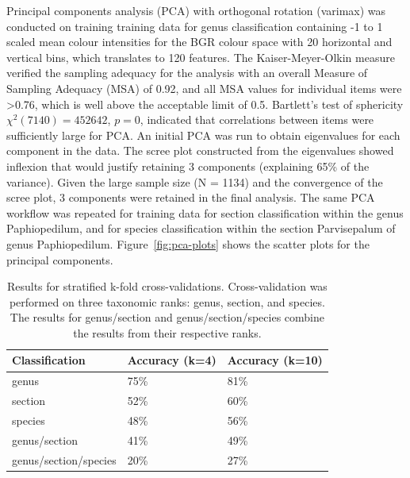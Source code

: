\documentclass[3p,twocolumn,10pt]{elsarticle}
\begin{document}
Principal components analysis (PCA) with orthogonal rotation (varimax) was conducted on training training data for genus classification containing -1 to 1 scaled mean colour intensities for the BGR colour space with 20 horizontal and vertical bins, which translates to 120 features. The Kaiser-Meyer-Olkin measure verified the sampling adequacy for the analysis with an overall Measure of Sampling Adequacy (MSA) of 0.92, and all MSA values for individual items were >0.76, which is well above the acceptable limit of 0.5. Bartlett's test of sphericity $\chi^2 (7140) = 452642$, $p = 0$, indicated that correlations between items were sufficiently large for PCA. An initial PCA was run to obtain eigenvalues for each component in the data. The scree plot constructed from the eigenvalues showed inflexion that would justify retaining 3 components (explaining 65\% of the variance). Given the large sample size (N = 1134) and the convergence of the scree plot, 3 components were retained in the final analysis. The same PCA workflow was repeated for training data for section classification within the genus Paphiopedilum, and for species classification within the section Parvisepalum of genus Paphiopedilum. Figure~\ref{fig:pca-plots} shows the scatter plots for the principal components.

\begin{table}[h]\footnotesize
    \caption{Results for stratified k-fold cross-validations. Cross-validation was performed on three taxonomic ranks: genus, section, and species. The results for genus/section and genus/section/species combine the results from their respective ranks.}
    \begin{center}
    \begin{tabular}{lp{1.5cm}p{1.5cm}}
    \toprule
    \textbf{Classification} & \textbf{Accuracy (k=4)} & \textbf{Accuracy (k=10)} \\
    \midrule
    genus                   & 75\%    & 81\% \\
    section                 & 52\%    & 60\% \\
    species                 & 48\%    & 56\% \\
    genus/section           & 41\%    & 49\% \\
    genus/section/species   & 20\%    & 27\% \\
    \bottomrule
    \end{tabular}
    \end{center}
    \label{tbl:x-validation-results}
\end{table}
\end{document}
